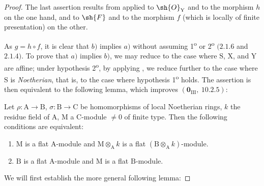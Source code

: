 \begin{proof}
The last assertion results from  applied to $\sh{O}_\mathrm{Y}$ and to the morphism $h$ on the one hand, and to $\sh{F}$ and to the morphism $f$ (which is locally of finite presentation) on the other.

As $g=h\circ f$, it is clear that $b)$ implies $a)$ without assuming 1\textsuperscript{o} or 2\textsuperscript{o} $(2.1.6$ and $2.1.4)$. To prove that $a)$ implies $b)$, we may reduce to the case where $\mathrm{S}$, $\mathrm{X}$, and $\mathrm{Y}$ are affine; under hypothesis 2\textsuperscript{o}, by applying , we reduce further to the case where $\mathrm{S}$ is \emph{Noetherian}, that is, to the case where hypothesis 1\textsuperscript{o} holds. The assertion is then equivalent to the following lemma, which improves $(\mathbf{0}_{\mathrm{III}},~10.2.5)$:

\begin{lemma}[11.3.10.1]
\label{IV.11.3.10.1}
Let $\rho:\mathrm{A}\to\mathrm{B}$, $\sigma:\mathrm{B}\to\mathrm{C}$ be homomorphisms of local Noetherian rings, $k$ the residue field of $\mathrm{A}$, $\mathrm{M}$ a $\mathrm{C}$-module $\neq 0$ of finite type. Then the following conditions are equivalent:
\begin{enumerate}[label=\emph{\alph*)}]
  \item $\mathrm{M}$ is a flat $\mathrm{A}$-module and $\mathrm{M}\otimes_\mathrm{A} k$ is a flat $(\mathrm{B}\otimes_\mathrm{A} k)$-module.
  \item $\mathrm{B}$ is a flat $\mathrm{A}$-module and $\mathrm{M}$ is a flat $\mathrm{B}$-module.
\end{enumerate}
\end{lemma}

We will first establish the more general following lemma:


\end{proof}
